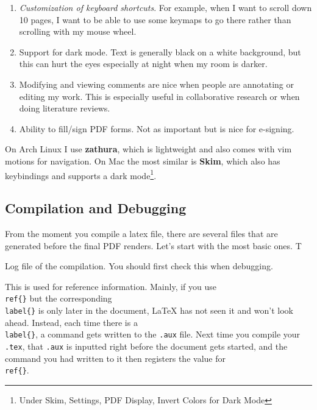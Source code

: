   \begin{enumerate}
    \item \textit{Customization of keyboard shortcuts}. For example, when I want to scroll down 10 pages, I want to be able to use some keymaps to go there rather than scrolling with my mouse wheel. 
    \item Support for dark mode. Text is generally black on a white background, but this can hurt the eyes especially at night when my room is darker. 
    \item Modifying and viewing comments are nice when people are annotating or editing my work. This is especially useful in collaborative research or when doing literature reviews. 
    \item Ability to fill/sign PDF forms. Not as important but is nice for e-signing. 
  \end{enumerate}
  
  On Arch Linux I use \textbf{zathura}, which is lightweight and also comes with vim motions for navigation. On Mac the most similar is \textbf{Skim}, which also has keybindings and supports a dark mode\footnote{Under Skim, Settings, PDF Display, Invert Colors for Dark Mode}. 

\subsection{Compilation and Debugging}

  From the moment you compile a latex file, there are several files that are generated before the final PDF renders. Let's start with the most basic ones. T

  \begin{definition}
    \label{def:paper-log}
    Log file of the compilation. You should first check this when debugging. 
  \end{definition}

  \begin{definition}
    \label{def:paper-aux}
    This is used for reference information. Mainly, if you use \texttt{\\ref\{\}} but the corresponding \texttt{\\label\{\}} is only later in the document, LaTeX has not seen it and won't look ahead. Instead, each time there is a \texttt{\\label\{\}}, a command gets written to the \texttt{.aux} file. Next time you compile your \texttt{.tex}, that \texttt{.aux} is inputted right before the document gets started, and the command you had written to it then registers the value for \texttt{\\ref\{\}}. 
  \end{definition}

